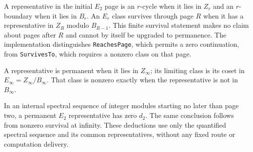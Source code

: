 \begin{definition}
  \label{def:ss-cycle-boundary-survival}
  \leanok
  A representative in the initial $E_2$ page is an $r$-cycle when it lies in
  $Z_r$ and an $r$-boundary when it lies in $B_r$.  An $E_r$ class survives
  through page $R$ when it has a representative in $Z_R$ modulo
  $B_{R-1}$.  This finite survival statement makes no claim about pages after
  $R$ and cannot by itself be upgraded to permanence.
  The implementation distinguishes \texttt{ReachesPage}, which permits a
  zero continuation, from \texttt{SurvivesTo}, which requires a nonzero class
  on that page.
\end{definition}

\begin{definition}
  \label{def:ss-permanent-einfty-class}
  \leanok
  A representative is permanent when it lies in $Z_\infty$; its limiting
  class is its coset in $E_\infty=Z_\infty/B_\infty$.  That class is nonzero
  exactly when the representative is not in $B_\infty$.
\end{definition}

\begin{proposition}
  \label{prop:ss-permanent-implies-page-two-cycle}
  \leanok
  In an internal spectral sequence of integer modules starting no later
  than page two, a permanent $E_2$ representative has zero $d_2$.
  The same conclusion follows from nonzero survival at infinity.
  These deductions use only the quantified spectral sequence and its common
  representatives, without any fixed route or computation delivery.
\end{proposition}



